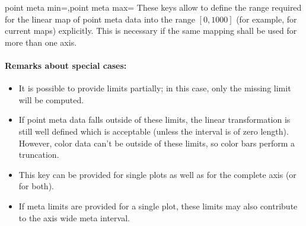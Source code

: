 \begin{pgfplotskeylist}{point meta min=,point meta max=}
    These keys allow to define the range required for the linear map of point
    meta data into the range $[0,1000]$ (for example, for current maps)
    explicitly. This is necessary if the same mapping shall be used for more
    than one axis.


    \paragraph{Remarks about special cases:}

    \begin{itemize}
        \item It is possible to provide limits partially; in this case, only
            the missing limit will be computed.
        \item If point meta data falls outside of these limits, the linear
            transformation is still well defined which is acceptable (unless
            the interval is of zero length). However, color data can't be
            outside of these limits, so color bars perform a truncation.
        \item This key can be provided for single plots as well as for the
            complete axis (or for both).
        \item If meta limits are provided for a single plot, these limits may
            also contribute to the axis wide meta interval.
    \end{itemize}
\end{pgfplotskeylist}


